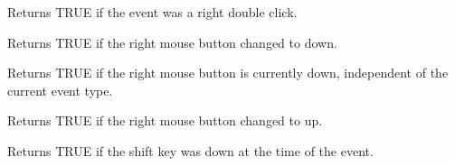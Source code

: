 Returns TRUE if the event was a right double click.



Returns TRUE if the right mouse button changed to down.



Returns TRUE if the right mouse button is currently down, independent
of the current event type.



Returns TRUE if the right mouse button changed to up.



Returns TRUE if the shift key was down at the time of the event.

